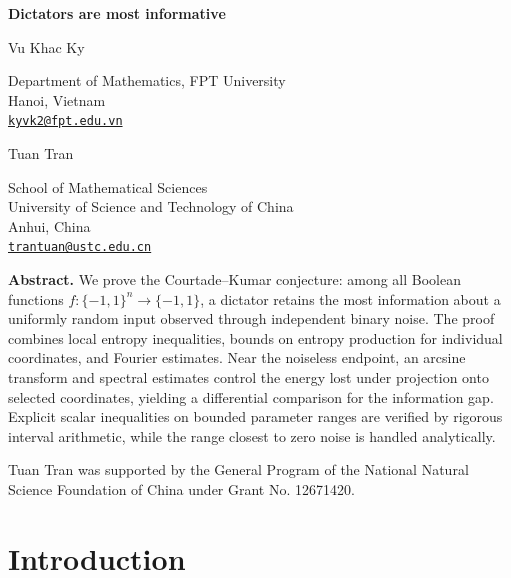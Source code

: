 \documentclass[11pt,letterpaper]{amsart}
\newcommand{\1}{\mathbf 1}
\numberwithin{equation}{section}
\begin{document}
\flushbottom
\pagestyle{plain}
\begin{titlepage}
\centering
\vspace*{12mm}
{\LARGE\bfseries Dictators are most informative\par}
\vspace{12mm}
{\large Vu Khac Ky\par}
\vspace{2mm}
Department of Mathematics, FPT University\\
Hanoi, Vietnam\\
\href{mailto:kyvk2@fpt.edu.vn}{\texttt{kyvk2@fpt.edu.vn}}
\vspace{7mm}

{\large Tuan Tran\par}
\vspace{2mm}
School of Mathematical Sciences\\
University of Science and Technology of China\\
Anhui, China\\
\href{mailto:trantuan@ustc.edu.cn}{\texttt{trantuan@ustc.edu.cn}}
\vspace{12mm}

\begin{minipage}{\textwidth}
\noindent\textbf{Abstract.} We prove the Courtade--Kumar conjecture: among all Boolean functions
$f\colon \{-1,1\}^n\to\{-1,1\}$, a dictator retains the most
information about a uniformly random input observed through
independent binary noise. The proof combines local entropy
inequalities, bounds on entropy production for individual
coordinates, and Fourier estimates.
Near the noiseless endpoint, an arcsine transform and spectral
estimates control the energy lost under projection onto selected
coordinates, yielding a differential comparison for the
information gap.
Explicit scalar inequalities on bounded parameter ranges are
verified by rigorous interval arithmetic, while the range
closest to zero noise is handled analytically.
\end{minipage}
\vfill
\begin{minipage}{\textwidth}
Tuan Tran was supported by the General Program of the National Natural Science Foundation of China under Grant No. 12671420.
\end{minipage}
\end{titlepage}
\setcounter{page}{1}

\section{Introduction}\label{sec:introduction}
\end{document}
